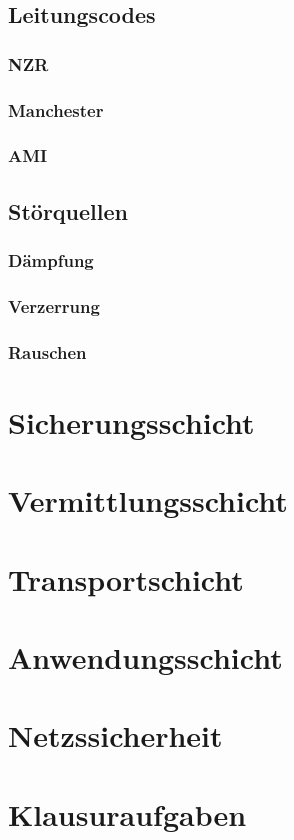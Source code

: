 \documentclass[a4paper, 14pt]{article}
\begin{document}
	\subsection{Leitungscodes}

	\subsubsection{NZR}

	\subsubsection{Manchester}

	\subsubsection{AMI}

	\subsection{Störquellen}

	\subsubsection{Dämpfung}

	\subsubsection{Verzerrung}

	\subsubsection{Rauschen}

	\section{Sicherungsschicht}

	\section{Vermittlungsschicht}

	\section{Transportschicht}

	\section{Anwendungsschicht}

	\section{Netzssicherheit}

	\section{Klausuraufgaben}
\end{document}
